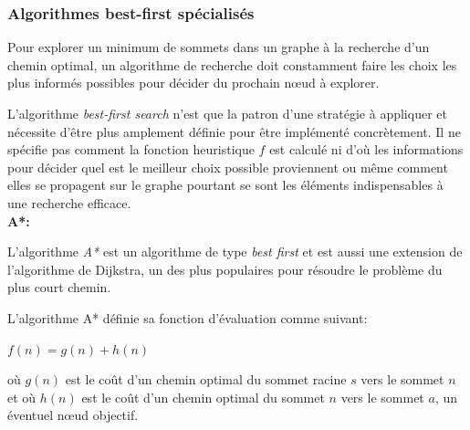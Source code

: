 
\subsubsection{Algorithmes best-first spécialisés}
Pour explorer un minimum de sommets dans un graphe à la recherche d'un chemin optimal, un algorithme de recherche doit constamment faire les choix les plus informés possibles pour décider du prochain nœud à explorer.

L'algorithme \textit{best-first search} n'est que la patron d'une stratégie à appliquer et nécessite d'être plus amplement définie pour être implémenté concrètement.
Il ne spécifie pas comment la fonction heuristique $f$ est calculé ni d'où les informations pour décider quel est le meilleur choix possible proviennent ou même comment elles se propagent sur le graphe pourtant se sont les éléments indispensables à une recherche efficace. \\

{\setlength{\parindent}{0cm}\textbf{A*:}}

L'algorithme \textit{A*} est un algorithme de type \textit{best first} et est aussi une extension de l'algorithme de Dijkstra\cite{dijkstra}, un des plus populaires pour résoudre le problème du plus court chemin. 

L'algorithme A* définie\cite{description-a*} sa fonction d'évaluation comme suivant: 

\begin{center}
    $f(n) = g(n) + h(n)$
\end{center}

où $g(n)$ est le coût d'un chemin optimal du sommet racine $s$ vers le sommet $n$ et où $h(n)$ est le coût d'un chemin optimal du sommet $n$ vers le sommet $a$, un éventuel nœud objectif.\\    



